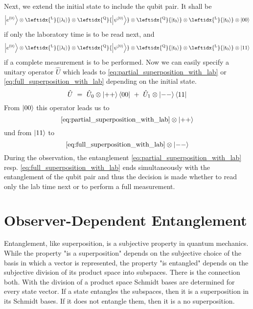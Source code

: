 \documentclass[12pt]{article}
\begin{document}
Next, we extend the initial state to include the qubit pair. It shall be 
\begin{equation*}
\ket{e^{(0)}} 
\otimes \leftidx{^\mathrm{L}}{\ket{\lambda_l}} 
\otimes \leftidx{^\mathrm{Q}}{\ket{\psi^{(0)}}}
\otimes \leftidx{^\mathrm{Q}}{\ket{t_0}}
\otimes \leftidx{^\mathrm{L}}{\ket{t_0}}
\otimes \ket{00}
\end{equation*}
if only the laboratory time is to be read next, and 
\begin{equation*}
\ket{e^{(0)}} 
\otimes \leftidx{^\mathrm{L}}{\ket{\lambda_l}} 
\otimes \leftidx{^\mathrm{Q}}{\ket{\psi^{(0)}}}
\otimes \leftidx{^\mathrm{Q}}{\ket{t_0}}
\otimes \leftidx{^\mathrm{L}}{\ket{t_0}}
\otimes \ket{11}
\end{equation*}
if a complete measurement is to be performed. Now we can easily specify a unitary operator $\hat{U}$ which leads to \eqref{eq:partial_superposition_with_lab} or \eqref{eq:full_superposition_with_lab} depending on the initial state.
\begin{equation*}
\hat{U}\ =\ \hat{U}_0 \otimes \ket{++}\bra{00}\ +\ \hat{U}_1 \otimes \ket{--}\bra{11}
\end{equation*}
From $\ket{00}$ this operator leads us to 
\begin{equation*}
\eqref{eq:partial_superposition_with_lab} \otimes \ket{++}
\end{equation*}
und from $\ket{11}$ to
\begin{equation*}
\eqref{eq:full_superposition_with_lab} \otimes \ket{--}
\end{equation*}
During the observation, the entanglement \eqref{eq:partial_superposition_with_lab} resp. \eqref{eq:full_superposition_with_lab} ends simultaneously with the entanglement of the qubit pair and thus the decision is made whether to read only the lab time next or to perform a full measurement. 

\section{Observer-Dependent Entanglement}

Entanglement, like superposition, is a subjective property in quantum mechanics. While the property "is a superposition" depends on the subjective choice of the basis in which a vector is represented, the property "is entangled" depends on the subjective division of its product space into subspaces. There is the connection both. With the division of a product space Schmidt bases are determined for every state vector. If a state entangles the subspaces, then it is a superposition in its Schmidt bases. If it does not entangle them, then it is a no superposition.
\end{document}
